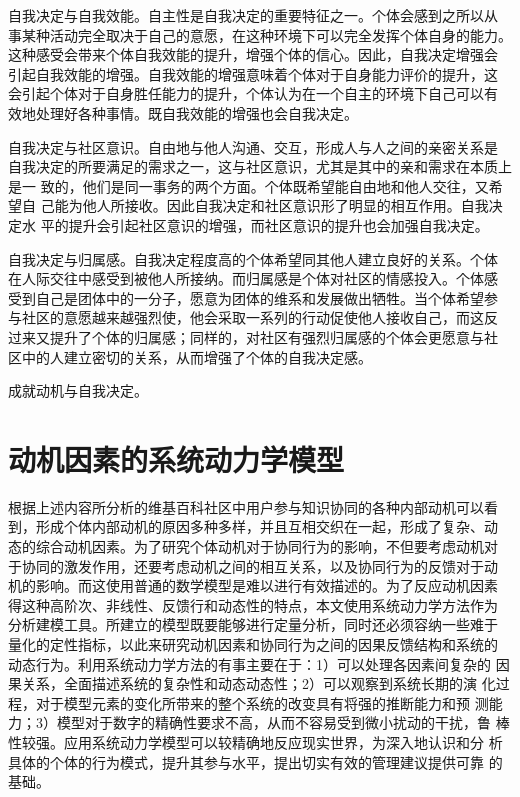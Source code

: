自我决定与自我效能。自主性是自我决定的重要特征之一。个体会感到之所以从
事某种活动完全取决于自己的意愿，在这种环境下可以完全发挥个体自身的能力。
这种感受会带来个体自我效能的提升，增强个体的信心。因此，自我决定增强会
引起自我效能的增强。自我效能的增强意味着个体对于自身能力评价的提升，这
会引起个体对于自身胜任能力的提升，个体认为在一个自主的环境下自己可以有
效地处理好各种事情。既自我效能的增强也会自我决定。

自我决定与社区意识。自由地与他人沟通、交互，形成人与人之间的亲密关系是
自我决定的所要满足的需求之一，这与社区意识，尤其是其中的亲和需求在本质上是一
致的，他们是同一事务的两个方面。个体既希望能自由地和他人交往，又希望自
己能为他人所接收。因此自我决定和社区意识形了明显的相互作用。自我决定水
平的提升会引起社区意识的增强，而社区意识的提升也会加强自我决定。

自我决定与归属感。自我决定程度高的个体希望同其他人建立良好的关系。个体
在人际交往中感受到被他人所接纳。而归属感是个体对社区的情感投入。个体感
受到自己是团体中的一分子，愿意为团体的维系和发展做出牺牲。当个体希望参
与社区的意愿越来越强烈使，他会采取一系列的行动促使他人接收自己，而这反
过来又提升了个体的归属感；同样的，对社区有强烈归属感的个体会更愿意与社
区中的人建立密切的关系，从而增强了个体的自我决定感。

成就动机与自我决定。


\section{动机因素的系统动力学模型}
\label{sec:sd-model}
根据上述内容所分析的维基百科社区中用户参与知识协同的各种内部动机可以看
到，形成个体内部动机的原因多种多样，并且互相交织在一起，形成了复杂、动
态的综合动机因素。为了研究个体动机对于协同行为的影响，不但要考虑动机对
于协同的激发作用，还要考虑动机之间的相互关系，以及协同行为的反馈对于动
机的影响。而这使用普通的数学模型是难以进行有效描述的。为了反应动机因素
得这种高阶次、非线性、反馈行和动态性的特点，本文使用系统动力学方法作为
分析建模工具。所建立的模型既要能够进行定量分析，同时还必须容纳一些难于
量化的定性指标，以此来研究动机因素和协同行为之间的因果反馈结构和系统的
动态行为。利用系统动力学方法的有事主要在于：1）可以处理各因素间复杂的
因果关系，全面描述系统的复杂性和动态动态性；2）可以观察到系统长期的演
化过程，对于模型元素的变化所带来的整个系统的改变具有将强的推断能力和预
测能力；3）模型对于数字的精确性要求不高，从而不容易受到微小扰动的干扰，鲁
棒性较强。应用系统动力学模型可以较精确地反应现实世界，为深入地认识和分
析具体的个体的行为模式，提升其参与水平，提出切实有效的管理建议提供可靠
的基础。

